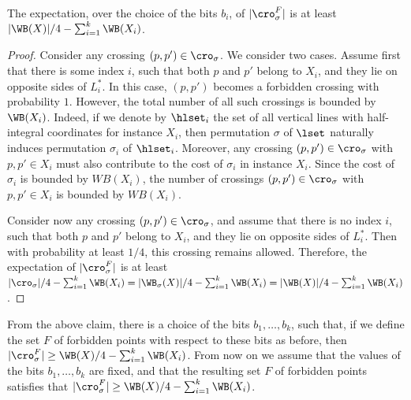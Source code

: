 \begin{claim}\label{claim: many expected crossings}
	The expectation, over the choice of the bits $b_i$, of $|\cro^F_{\sigma}|$ is at least $|\WB(X)|/4-\sum_{i=1}^k\WB(X_i)$.
\end{claim}

\begin{proof}
	Consider any crossing $(p,p')\in \cro_{\sigma}$. We consider two cases. Assume first that there is some index $i$, such that both $p$ and $p'$ belong to $X_i$, and they lie on opposite sides of $L^*_i$. In this case, $(p,p')$ becomes a forbidden crossing with probability $1$. However, the total number of all such crossings is bounded by $\WB(X_i)$. Indeed, if we denote by $\hlset_i$ the set of all vertical lines with half-integral coordinates for instance $X_i$, then permutation $\sigma$ of $\lset$ naturally induces permutation $\sigma_i$ of $\hlset_i$. Moreover, any crossing $(p,p')\in\cro_{\sigma}$ with $p,p'\in X_i$ must also contribute to the cost of $\sigma_i$ in instance $X_i$. Since the cost of $\sigma_i$ is bounded by $WB(X_i)$, the number of crossings  $(p,p')\in \cro_{\sigma}$ with $p,p'\in X_i$ is bounded by $WB(X_i)$.
	
	Consider now any crossing $(p,p')\in \cro_{\sigma}$, and assume that there is no  index $i$, such that both $p$ and $p'$ belong to $X_i$, and they lie on opposite sides of $L^*_i$. Then with probability at least $1/4$, this crossing remains allowed. Therefore, the expectation of $|\cro^F_{\sigma}|$ is at least $|\cro_{\sigma}|/4-\sum_{i=1}^k\WB(X_i)=|\WB_{\sigma}(X)|/4-\sum_{i=1}^k\WB(X_i)=|\WB(X)|/4-\sum_{i=1}^k\WB(X_i) $.
\end{proof}


From the above claim, there is a choice of the bits $b_1,\ldots,b_k$, such that, if we define the set $F$ of forbidden points with respect to these bits as before, then $|\cro^F_{\sigma}|\geq \WB(X)/4-\sum_{i=1}^k\WB(X_i)$. From now on we assume that the values of the bits $b_1,\ldots,b_k$ are fixed, and that the resulting set $F$ of forbidden points satisfies that $|\cro^F_{\sigma}|\geq \WB(X)/4-\sum_{i=1}^k\WB(X_i)$.


%
%
%
%
